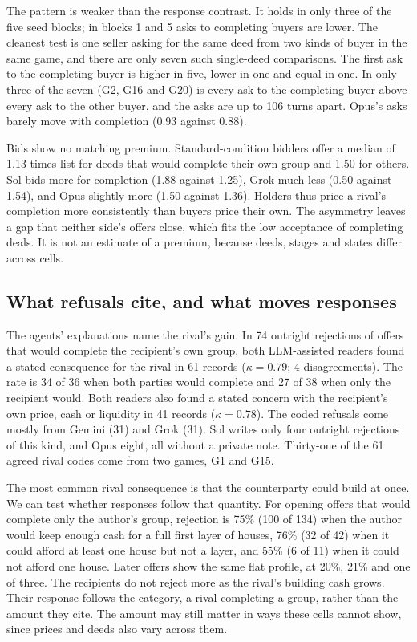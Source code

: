 The pattern is weaker than the response contrast. It holds in only three of the five seed blocks; in blocks 1 and 5 asks to completing buyers are lower. The cleanest test is one seller asking for the same deed from two kinds of buyer in the same game, and there are only seven such single-deed comparisons. The first ask to the completing buyer is higher in five, lower in one and equal in one. In only three of the seven (G2, G16 and G20) is every ask to the completing buyer above every ask to the other buyer, and the asks are up to 106 turns apart. Opus's asks barely move with completion (0.93 against 0.88).

Bids show no matching premium. Standard-condition bidders offer a median of 1.13 times list for deeds that would complete their own group and 1.50 for others. Sol bids more for completion (1.88 against 1.25), Grok much less (0.50 against 1.54), and Opus slightly more (1.50 against 1.36). Holders thus price a rival's completion more consistently than buyers price their own. The asymmetry leaves a gap that neither side's offers close, which fits the low acceptance of completing deals. It is not an estimate of a premium, because deeds, stages and states differ across cells.

\subsection{What refusals cite, and what moves responses}

The agents' explanations name the rival's gain. In 74 outright rejections of offers that would complete the recipient's own group, both LLM-assisted readers found a stated consequence for the rival in 61 records ($\kappa=0.79$; 4 disagreements). The rate is 34 of 36 when both parties would complete and 27 of 38 when only the recipient would. Both readers also found a stated concern with the recipient's own price, cash or liquidity in 41 records ($\kappa=0.78$). The coded refusals come mostly from Gemini (31) and Grok (31). Sol writes only four outright rejections of this kind, and Opus eight, all without a private note. Thirty-one of the 61 agreed rival codes come from two games, G1 and G15.

The most common rival consequence is that the counterparty could build at once. We can test whether responses follow that quantity. For opening offers that would complete only the author's group, rejection is 75\% (100 of 134) when the author would keep enough cash for a full first layer of houses, 76\% (32 of 42) when it could afford at least one house but not a layer, and 55\% (6 of 11) when it could not afford one house. Later offers show the same flat profile, at 20\%, 21\% and one of three. The recipients do not reject more as the rival's building cash grows. Their response follows the category, a rival completing a group, rather than the amount they cite. The amount may still matter in ways these cells cannot show, since prices and deeds also vary across them.


